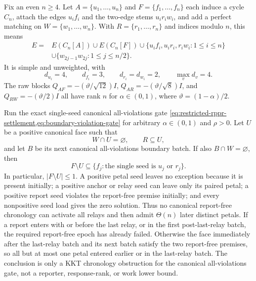 \begin{proposition}
\label{prop:petal-cycle-relay-first-obstruction}
Fix an even $n\geq4$.  Let
$A=\{u_1,\ldots,u_n\}$ and $F=\{f_1,\ldots,f_n\}$ each induce a cycle
$C_n$, attach the edges $u_if_i$ and the two-edge stems $u_ir_iw_i$, and
add a perfect matching on $W=\{w_1,\ldots,w_n\}$.  With
$R=\{r_1,\ldots,r_n\}$ and indices modulo $n$, this means
\begin{equation}
 \begin{split}
 E={}&E(C_n[A])\cup E(C_n[F])
      \cup\{u_if_i,u_ir_i,r_iw_i:1\leq i\leq n\}\\
    &\cup\{w_{2j-1}w_{2j}:1\leq j\leq n/2\}.
 \end{split}
 \label{eq:petal-cycle-relay-edges}
\end{equation}
It is simple and unweighted, with
\begin{equation*}
 d_{u_i}=4,\qquad d_{f_i}=3,\qquad
 d_{r_i}=d_{w_i}=2,\qquad \max_v d_v=4.
\end{equation*}
The raw blocks $Q_{AF}=-(\vartheta/\sqrt{12})I$,
$Q_{AR}=-(\vartheta/\sqrt8)I$, and
$Q_{RW}=-(\vartheta/2)I$ all have rank $n$ for
$\alpha\in(0,1)$, where $\vartheta=(1-\alpha)/2$.

Run the exact single-seed canonical all-violations gate
\cref{eq:restricted-rppr-settlement,eq:boundary-violation-gate} for arbitrary
$\alpha\in(0,1)$ and $\rho>0$.  Let $U$ be a positive canonical face such
that
\begin{equation*}
 W\cap U=\varnothing,\qquad R\subseteq U,
\end{equation*}
and let $B$ be its next canonical all-violations boundary batch.  If also
$B\cap W=\varnothing$, then
\begin{equation}
 F\setminus U
 \subseteq
 \{f_j:\text{the single seed is }u_j\text{ or }r_j\}.
 \label{eq:petal-cycle-at-most-seed-exception}
\end{equation}
In particular, $|F\setminus U|\leq1$.  A positive petal seed leaves no
exception because it is present initially; a positive anchor or relay seed
can leave only its paired petal; a positive report seed violates the
report-free premise initially; and every nonpositive seed load gives the zero
solution.  Thus no canonical report-free chronology can activate all relays
and then admit $\Theta(n)$ later distinct petals.  If a report enters with or
before the last relay, or in the first post-last-relay batch, the required
report-free epoch has already failed.  Otherwise the face immediately after
the last-relay batch and its next batch satisfy the two report-free premises,
so all but at most one petal entered earlier or in the last-relay batch.  The
conclusion is only a KKT chronology obstruction for the canonical
all-violations gate, not a reporter, response-rank, or work lower bound.
\end{proposition}

